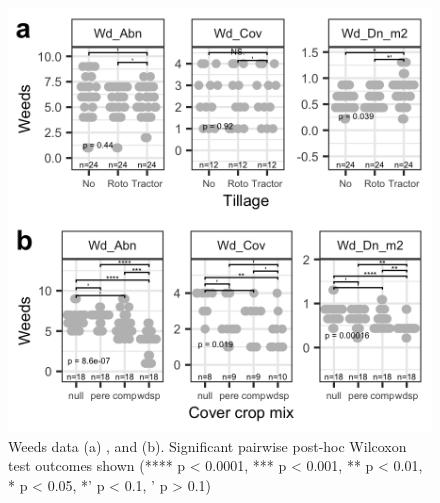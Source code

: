 \documentclass[
  12pt,
]{article}
\begin{document}
\begin{figure}
\includegraphics[width=12.5in]{../figs/weedPlot} \caption{Weeds data (a) , and (b). Significant pairwise post-hoc Wilcoxon test outcomes shown (**** p < 0.0001, *** p < 0.001, ** p < 0.01, * p < 0.05, *' p < 0.1, ' p > 0.1)}\label{fig:weedsFig}
\end{figure}
\end{document}
